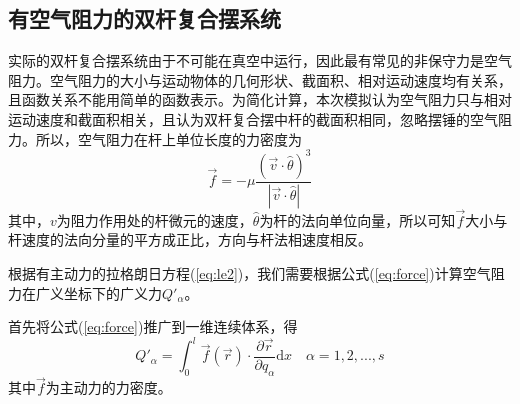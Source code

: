 \documentclass[a4paper,12pt,titlepage]{article}
\begin{document}
\subsection{有空气阻力的双杆复合摆系统}
实际的双杆复合摆系统由于不可能在真空中运行，因此最有常见的非保守力是空气阻力。空气阻力的大小与运动物体的几何形状、截面积、相对运动速度均有关系，且函数关系不能用简单的函数表示。为简化计算，本次模拟认为空气阻力只与相对运动速度和截面积相关，且认为双杆复合摆中杆的截面积相同，忽略摆锤的空气阻力。所以，空气阻力在杆上单位长度的力密度为
\begin{equation}
\label{eq:af}
	\vec{f}=-\mu \frac{(\vec{v}\cdot\hat{\theta})^3}{|\vec{v}\cdot\hat{\theta}|}
\end{equation}
其中，$v$为阻力作用处的杆微元的速度，$\hat{\theta}$为杆的法向单位向量，所以可知$\vec{f}$大小与杆速度的法向分量的平方成正比，方向与杆法相速度相反。

根据有主动力的拉格朗日方程(\ref{eq:le2})，我们需要根据公式(\ref{eq:force})计算空气阻力在广义坐标下的广义力$Q'_\alpha$。

首先将公式(\ref{eq:force})推广到一维连续体系，得
\begin{equation}
\label{eq:force1}
	Q'_\alpha=\int_0^l \vec{f}(\vec{r})\cdot\frac{\partial \vec{r}}{\partial q_\alpha}\mathrm{d}x\quad \alpha=1,2,...,s
\end{equation}
其中$\vec{f}$为主动力的力密度。
\end{document}
